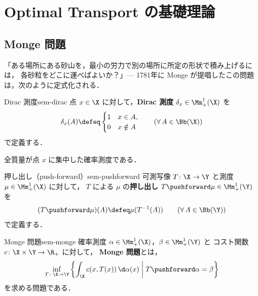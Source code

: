 \chapter{Optimal Transport の基礎理論}
\label{ch:seminar-01}

\section{Monge 問題}
\label{sec:sem-monge}

「ある場所にある砂山を，最小の労力で別の場所に所定の形状で積み上げるには，
各砂粒をどこに運べばよいか？」---
1781年に Monge が提唱したこの問題は，次のように定式化される．

\begin{definition}{Dirac 測度}{sem-dirac}
  点 $x \in \X$ に対して，\textbf{Dirac 測度} $\delta_x \in \Mm_+^1(\X)$ を
  \[
    \delta_x(A) \defeq
    \begin{cases}
      1 & x \in A, \\
      0 & x \notin A
    \end{cases}
    \qquad (\forall\, A \in \Bb(\X))
  \]
  で定義する．
\end{definition}

全質量が点 $x$ に集中した確率測度である．

\begin{definition}{押し出し（push-forward）}{sem-pushforward}
  可測写像 $T \colon \X \to \Y$ と測度 $\mu \in \Mm_+^1(\X)$ に対して，
  $T$ による $\mu$ の\textbf{押し出し} $T\pushforward \mu \in \Mm_+^1(\Y)$ を
  \[
    (T\pushforward \mu)(A) \defeq \mu(T^{-1}(A))
    \qquad (\forall\, A \in \Bb(\Y))
  \]
  で定義する．
\end{definition}

\begin{definition}{Monge 問題}{sem-monge}
  確率測度 $\alpha \in \Mm_+^1(\X)$，$\beta \in \Mm_+^1(\Y)$ と
  コスト関数 $c \colon \X \times \Y \to \R_+$ に対して，
  \textbf{Monge 問題}とは，
  \[
    \inf_{T \colon \X \to \Y}
    \left\{
    \int_{\X} c(x, T(x)) \, \d\alpha(x)
    \;\middle|\;
    T\pushforward \alpha = \beta
    \right\}
  \]
  を求める問題である．
\end{definition}

